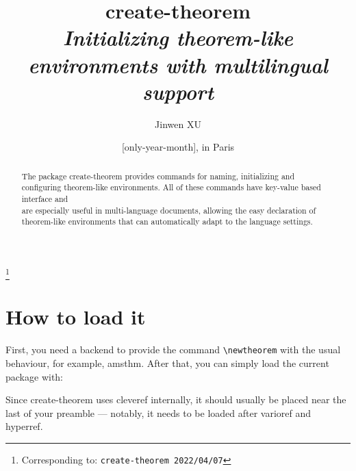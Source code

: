 \documentclass[classical]{einfart}
\newcommand{\meta}[1]{$\langle${\normalfont\itshape#1}$\rangle$}
\newenvironment{tip}[1][Tip]
  {%
    \LocallyStopLineNumbers%
    \begin{tcolorbox}[breakable,
        enhanced,
        width = \textwidth,
        colback = paper, colbacktitle = paper,
        colframe = gray!50, boxrule=0.2mm,
        coltitle = black,
        fonttitle = \sffamily,
        attach boxed title to top left = {yshift=-\tcboxedtitleheight/2, xshift=.5cm},
        boxed title style = {boxrule=0pt, colframe=paper},
        before skip = 3mm,
        after skip = 3mm,
        top = 2.5mm,
        bottom = 1.5mm,
        title={\scshape\sffamily #1}]%
  }
  {%
    \end{tcolorbox}%
    \ResumeLineNumbers%
  }
\newcommand{\createtheorempackage}{\textsf{create-theorem}}
\begin{document}
\def\PackageVersion{2022/04/07}

\title{\createtheorempackage{}\\\smallskip\itshape Initializing theorem-like environments with multilingual support}
\author{Jinwen XU}
\thanks{Corresponding to: \texttt{\createtheorempackage{} \PackageVersion}}
\date{\TheDate{\PackageVersion}[only-year-month], in Paris}

\maketitle

\begin{abstract}
    \raggedleft
    The package \createtheorempackage{} provides commands for naming, initializing and configuring theorem-like environments. All of these commands have key-value based interface and \\are especially useful in multi-language documents, allowing the easy declaration of \\theorem-like environments that can automatically adapt to the language settings.
\end{abstract}

\vspace{-.5\baselineskip}



\section{How to load it}

First, you need a backend to provide the command \lstinline|\newtheorem| with the usual behaviour, for example, \textsf{amsthm}. After that, you can simply load the current package with:

\begin{code}
\usepackage[(*\meta{options}*)]{create-theorem}
\end{code}

\begin{tip}
    Since \createtheorempackage{} uses \textsf{cleveref} internally, it should usually be placed near the last of your preamble --- notably, it needs to be loaded after \textsf{varioref} and \textsf{hyperref}.
\end{tip}
\end{document}
